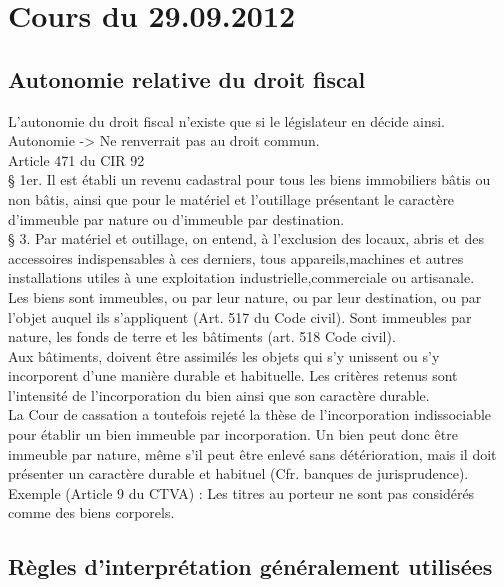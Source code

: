 \documentclass{book}
\begin{document}
\chapter{Cours du 29.09.2012}

\section{Autonomie relative du droit fiscal}

L'autonomie du droit fiscal n'existe que si le législateur en décide ainsi. Autonomie -> Ne renverrait pas au droit commun.\\

Article 471 du CIR 92\\
   § 1er. Il est établi un revenu cadastral pour tous les biens immobiliers bâtis ou non bâtis, ainsi que pour le matériel et l'outillage présentant le caractère d'immeuble par nature ou d'immeuble par destination.\\

   § 3. Par matériel et outillage, on entend, à l'exclusion des locaux, abris et des accessoires indispensables à ces derniers, tous appareils,machines et autres installations utiles à une exploitation industrielle,commerciale ou artisanale.\\


Les biens sont immeubles, ou par leur nature, ou par leur destination, ou par l'objet auquel ils s'appliquent (Art. 517 du Code civil). Sont immeubles par nature, les fonds de terre et les bâtiments (art. 518 Code civil).\\

Aux bâtiments, doivent être assimilés les objets qui s'y unissent ou s'y incorporent d'une manière durable et habituelle. Les critères retenus sont l'intensité de l'incorporation du bien ainsi que son caractère durable.\\

La Cour de cassation a toutefois rejeté la thèse de l'incorporation indissociable pour établir un bien immeuble par incorporation. Un bien peut donc être immeuble par nature, même s'il peut être enlevé sans détérioration, mais il doit présenter un caractère durable et habituel (Cfr. banques de jurisprudence).\\

Exemple (Article 9 du CTVA) : Les titres au porteur ne sont pas considérés comme des biens corporels.\\

\section{Règles d'interprétation généralement utilisées}
\end{document}
